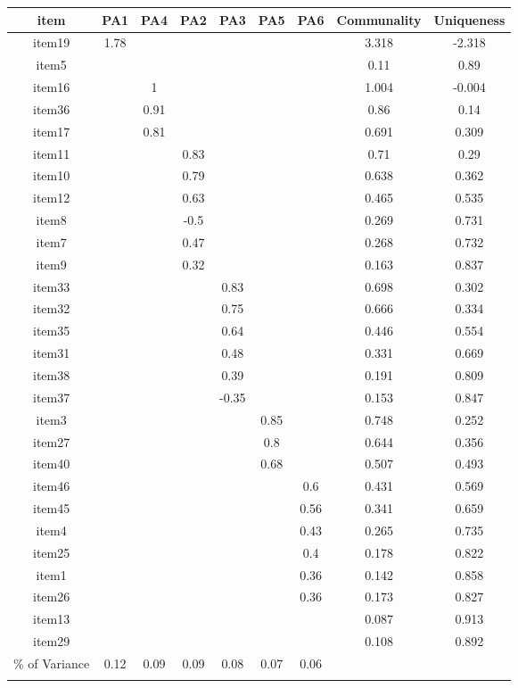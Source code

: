 \begin{appendix}
\begin{table}[tbp]
\begin{center}
\begin{threeparttable}
{\begin{tabular}{ccccccccc}
\toprule
item & \multicolumn{1}{c}{PA1} & \multicolumn{1}{c}{PA4} & \multicolumn{1}{c}{PA2} & \multicolumn{1}{c}{PA3} & \multicolumn{1}{c}{PA5} & \multicolumn{1}{c}{PA6} & \multicolumn{1}{c}{Communality} & \multicolumn{1}{c}{Uniqueness}\\
\midrule
item19 & 1.78 &  &  &  &  &  & 3.318 & -2.318\\
item5 &  &  &  &  &  &  & 0.11 & 0.89\\
item16 &  & 1 &  &  &  &  & 1.004 & -0.004\\
item36 &  & 0.91 &  &  &  &  & 0.86 & 0.14\\
item17 &  & 0.81 &  &  &  &  & 0.691 & 0.309\\
item11 &  &  & 0.83 &  &  &  & 0.71 & 0.29\\
item10 &  &  & 0.79 &  &  &  & 0.638 & 0.362\\
item12 &  &  & 0.63 &  &  &  & 0.465 & 0.535\\
item8 &  &  & -0.5 &  &  &  & 0.269 & 0.731\\
item7 &  &  & 0.47 &  &  &  & 0.268 & 0.732\\
item9 &  &  & 0.32 &  &  &  & 0.163 & 0.837\\
item33 &  &  &  & 0.83 &  &  & 0.698 & 0.302\\
item32 &  &  &  & 0.75 &  &  & 0.666 & 0.334\\
item35 &  &  &  & 0.64 &  &  & 0.446 & 0.554\\
item31 &  &  &  & 0.48 &  &  & 0.331 & 0.669\\
item38 &  &  &  & 0.39 &  &  & 0.191 & 0.809\\
item37 &  &  &  & -0.35 &  &  & 0.153 & 0.847\\
item3 &  &  &  &  & 0.85 &  & 0.748 & 0.252\\
item27 &  &  &  &  & 0.8 &  & 0.644 & 0.356\\
item40 &  &  &  &  & 0.68 &  & 0.507 & 0.493\\
item46 &  &  &  &  &  & 0.6 & 0.431 & 0.569\\
item45 &  &  &  &  &  & 0.56 & 0.341 & 0.659\\
item4 &  &  &  &  &  & 0.43 & 0.265 & 0.735\\
item25 &  &  &  &  &  & 0.4 & 0.178 & 0.822\\
item1 &  &  &  &  &  & 0.36 & 0.142 & 0.858\\
item26 &  &  &  &  &  & 0.36 & 0.173 & 0.827\\
item13 &  &  &  &  &  &  & 0.087 & 0.913\\
item29 &  &  &  &  &  &  & 0.108 & 0.892\\
\% of Variance & 0.12 & 0.09 & 0.09 & 0.08 & 0.07 & 0.06 &  & \\
\bottomrule
\addlinespace
\end{tabular}

}
\end{threeparttable}
\end{center}
\end{table}
\end{appendix}
